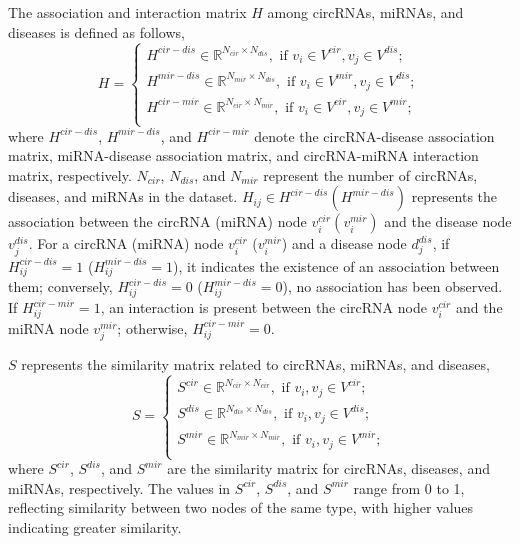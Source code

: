 \documentclass[journal,twoside,web]{ieeecolor}
\begin{document}
The association and interaction matrix $H$ among circRNAs, miRNAs, and diseases is defined as follows,
\begin{equation}
H = \left\{ \begin{array}{l}
{H^{cir-dis}} \in {\mathbb{R}^{N_{cir}\times N_{dis}}}, \text{ if } {v_i} \in {V^{cir}}, {v_j} \in {V^{dis}};\\[5pt]
{H^{mir-dis}} \in {\mathbb{R}^{N_{mir}\times N_{dis}}}, \text{ if } {v_i} \in {V^{mir}}, {v_j} \in {V^{dis}};\\[5pt]
{H^{cir-mir}} \in {\mathbb{R}^{N_{cir}\times N_{mir}}}, \text{ if } {v_i} \in {V^{cir}}, {v_j} \in {V^{mir}};\\
\end{array} \right.
\end{equation}
where $H^{cir-dis}$, $H^{mir-dis}$, and $H^{cir-mir}$ denote the circRNA-disease association matrix, miRNA-disease association matrix, and circRNA-miRNA interaction matrix, respectively. $N_{cir}$, $N_{dis}$, and $N_{mir}$ represent the number of circRNAs, diseases, and miRNAs in the dataset. 
$H_{ij} \in H^{cir-dis} (H^{mir-dis})$ represents the association between the circRNA (miRNA) node $v_i^{cir}(v_i^{mir})$ and the disease node $v_j^{dis}$. For a circRNA (miRNA) node $v_i^{cir}$ ($v_i^{mir}$) and a disease node $d_j^{dis}$, if $H_{ij}^{cir-dis}=1$ ($H_{ij}^{mir-dis}=1$), it indicates the existence of an association between them; conversely, $H_{ij}^{cir-dis}=0$ ($H_{ij}^{mir-dis}=0$), no association has been observed. If $H_{ij}^{cir-mir}=1$, an interaction is present between the circRNA node $v_i^{cir}$ and the miRNA node $v_j^{mir}$; otherwise, $H_{ij}^{cir-mir}=0$.


$S$ represents the similarity matrix related to circRNAs, miRNAs, and diseases,
\begin{equation}
S = \left\{ \begin{array}{l}
{S^{cir}} \in {\mathbb{R}^{N_{cir}\times N_{cir}}}, \text{ if } {v_i},{v_j} \in {V^{cir}};\\[5pt]
{S^{dis}} \in {\mathbb{R}^{N_{dis}\times N_{dis}}}, \text{ if } {v_i},{v_j} \in {V^{dis}};\\[5pt]
{S^{mir}} \in {\mathbb{R}^{N_{mir}\times N_{mir}}}, \text{ if } {v_i},{v_j} \in {V^{mir}};\\
\end{array} \right.
\end{equation}
where $S^{cir}$, $S^{dis}$, and $S^{mir}$ are the similarity matrix for circRNAs, diseases, and miRNAs, respectively. The values in $S^{cir}$, $S^{dis}$, and $S^{mir}$ range from 0 to 1, reflecting similarity between two nodes of the same type, with higher values indicating greater similarity.
\end{document}
